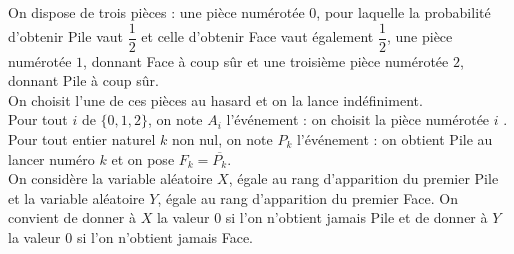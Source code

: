 \noindent
On dispose de trois pièces : une pièce numérotée $0$, pour laquelle la
probabilité d'obtenir Pile vaut $\dfrac{1}{2}$ et celle d'obtenir Face
vaut également $\dfrac{1}{2}$, une pièce numérotée $1$, donnant Face à
coup sûr et une troisième pièce numérotée $2$, donnant Pile à coup
sûr.\\
On choisit l'une de ces pièces au hasard et on la lance
indéfiniment.\\
Pour tout $i$ de $\{0, 1, 2\}$, on note $A_i$ l'événement : \og on
choisit la pièce numérotée $i$ \fg{}.\\
Pour tout entier naturel $k$ non nul, on note $P_k$ l'événement : \og
on obtient Pile au lancer numéro $k$ \fg{} et on pose $F_k =
\overline{P_k}$.\\
On considère la variable aléatoire $X$, égale au rang d'apparition du
premier Pile et la variable aléatoire $Y$, égale au rang d'apparition
du premier Face. On convient de donner à $X$ la valeur $0$ si l'on
n'obtient jamais Pile et de donner à $Y$ la valeur $0$ si l'on
n'obtient jamais Face.

